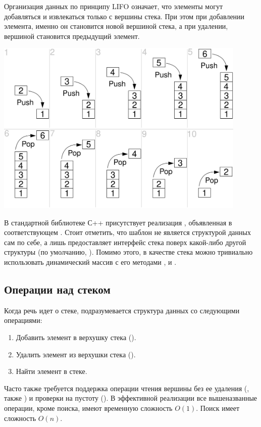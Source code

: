Организация данных по принципу LIFO означает, что элементы могут добавляться и извлекаться только с вершины стека. При этом при добавлении
элемента, именно он становится новой вершиной стека, а при удалении, вершиной становится предыдущий элемент.

\includegraphics[width=0.9\textwidth]{resources/19-26/stack.png}

В стандартной библиотеке С++ присутствует реализация , объявленная в соответствующем
. Стоит отметить, что шаблон  не является
структурой данных сам по себе, а лишь предоставляет интерфейс стека поверх какой-либо другой структуры (по умолчанию, ).
Помимо этого, в качестве стека можно тривиально использовать динамический массив  с его
методами ,  и .
\subsection{Операции над стеком}
Когда речь идет о стеке, подразумевается структура данных со следующими операциями:
\begin{enumerate}
  \item Добавить элемент в верхушку стека ().
  \item Удалить элемент из верхушки стека ().
  \item Найти элемент в стеке.
\end{enumerate}

Часто также требуется поддержка операции чтения вершины без ее удаления (, также ) и
проверки на пустоту (). В эффективной реализации все вышеназванные операции, кроме поиска, имеют временную сложность
\(O(1)\). Поиск имеет сложность $O(n)$.

